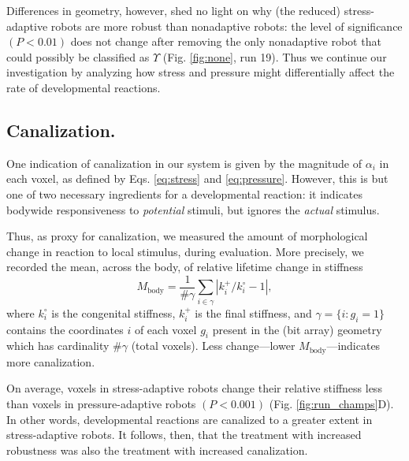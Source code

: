 Differences in geometry, however, shed no light on why (the reduced) stress-adaptive robots are more robust than nonadaptive robots:
the level of significance $(P<0.01)$ does not change after removing the only nonadaptive robot that could possibly be classified as $\Upsilon$ (Fig. \ref{fig:none}, run 19). 
Thus we continue our investigation by analyzing how stress and pressure might differentially affect the rate of developmental reactions.


\subsection{Canalization.}

One indication of canalization \citep{waddington1942canalization,kriegman2017morphological} in our system is given by the magnitude of $\alpha_i$ in each voxel, as defined by Eqs. \ref{eq:stress} and \ref{eq:pressure}.
However, this is but one of two necessary ingredients for a developmental reaction: it indicates bodywide responsiveness to \textit{potential} stimuli, but ignores the \textit{actual} stimulus.

Thus, as proxy for canalization, we measured the amount of morphological change in reaction to local stimulus, during evaluation.
More precisely, we recorded the mean, across the body, of relative lifetime change in stiffness
\begin{equation}
\label{eq:mu}
M_{\text{body}} = \frac{1}{\#\gamma} \sum_{i \in \gamma} \left| k_i^{+}/k_i^{\circ}-1 \right| ,
\end{equation}
where 
$k_i^{\circ}$ 
is the congenital stiffness,
$k_i^{+}$ is the final stiffness, and
$\gamma = \{i : g_i = 1 \}$ contains the coordinates $i$ of each voxel $g_i$ present in the (bit array) geometry which has cardinality $\#\gamma$ (total voxels). 
Less change---lower $M_{\text{body}}$---indicates more canalization.

On average, voxels in stress-adaptive robots change their relative stiffness less than voxels in pressure-adaptive robots $(P<0.001)$ (Fig. \ref{fig:run_champs}D).
In other words, developmental reactions are canalized to a greater extent in stress-adaptive robots.
It follows, then, that the treatment with increased robustness was also the treatment with increased canalization.

